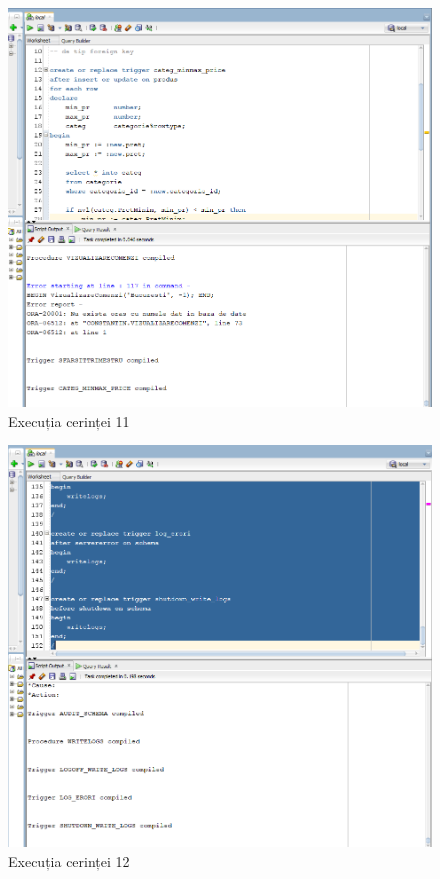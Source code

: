 \documentclass[12pt]{article}
\begin{document}
\begin{figure}[htp]
\centering
\includegraphics[width=1\linewidth]{Cerinta11.png}
\caption{Execuția cerinței 11}
\end{figure}

\begin{figure}[htp]
\centering
\includegraphics[width=1\linewidth]{Cerinta12.png}
\caption{Execuția cerinței 12}
\end{figure}
\end{document}
